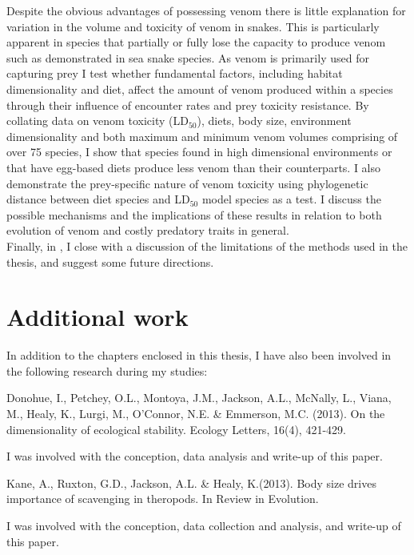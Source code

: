 Despite the obvious advantages of possessing venom there is little explanation for variation in the volume and toxicity of venom in snakes. This is particularly apparent in species that partially or fully lose the capacity to produce venom such as demonstrated in sea snake species. As venom is primarily used for capturing prey I test whether fundamental factors, including habitat dimensionality and diet, affect the amount of venom produced within a species through their influence of encounter rates and prey toxicity resistance. By collating data on venom toxicity (LD$_{50}$), diets, body size, environment dimensionality and both maximum and minimum venom volumes comprising of over 75 species, I show that species found in high dimensional environments or that have egg-based diets produce less venom than their counterparts. I also demonstrate the prey-specific nature of venom toxicity using phylogenetic distance between diet species and LD$_{50}$ model species as a test. I discuss the possible mechanisms and the implications of these results in relation to both evolution of venom and costly predatory traits in general.\\

%
%
Finally, in , I close with a discussion of the
limitations of the methods used in the thesis, and suggest some future
directions.

\section{\uppercase{A}dditional work}
In addition to the chapters enclosed in this thesis, I have also been involved in the following research during my studies:\\

\begin{singlespace}
Donohue, I., Petchey, O.L., Montoya, J.M., Jackson, A.L., McNally, L., Viana, M., Healy, K., Lurgi, M., O’Connor, N.E. \& Emmerson, M.C. (2013). On the dimensionality of ecological stability. Ecology Letters, 16(4), 421-429. \\
\end{singlespace}

\noindent
I was involved with the conception, data analysis and write-up of this paper. \\

\begin{singlespace}
Kane, A., Ruxton, G.D., Jackson, A.L. \& Healy, K.(2013). Body size drives importance of scavenging in theropods. In Review in Evolution. \\
\end{singlespace}

\noindent
I was involved with the conception, data collection and analysis, and write-up of this paper. \\



%
%

